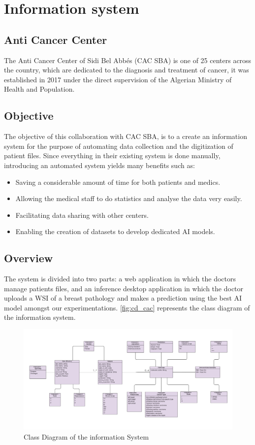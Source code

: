 \documentclass[
11pt, %
english, %
singlespacing, %
headsepline, %
]{project_structure}
\begin{document}
\newpage

\section{Information system}
\subsection{Anti Cancer Center}
The Anti Cancer Center of Sidi Bel Abbés (CAC SBA) is one of 25 centers across the country, which are dedicated to the diagnosis and treatment of cancer, it was established in 2017 under the direct supervision of the Algerian Ministry of Health and Population.
\subsection{Objective}
The objective of this collaboration with CAC SBA, is to a create an information system for the purpose of automating data collection and the digitization of patient files. Since everything in their existing system is done manually, introducing an automated system yields many benefits such as:
\begin{itemize}
    \item Saving a considerable amount of time for both patients and medics.
    \item Allowing the medical staff to do statistics and analyse the data very easily.
    \item Facilitating data sharing with other centers.
    \item Enabling the creation of datasets to develop dedicated AI models.
\end{itemize}
\subsection{Overview}

The system is divided into two parts: a web application in which the doctors manage patients files, and an inference desktop application in which the doctor uploads a WSI of a breast pathology and makes a prediction using the best AI model amongst our experimentations. \autoref{fig:cd_cac} represents the class diagram of the information system.

\begin{figure}[H]
    \centering
    \includegraphics[width=1\linewidth]{figures/SI/cd_cac.png}
    \caption{Class Diagram of the information System}
    \label{fig:cd_cac}
\end{figure}
\end{document}
